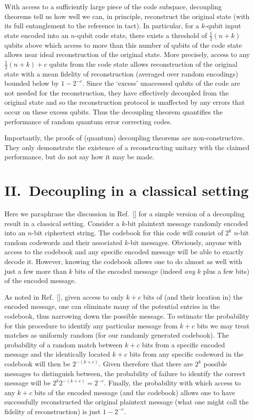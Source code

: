 \documentclass[aps,showpacs,prl,12pt]{revtex4}
\begin{document}
With access to a sufficiently large piece of the code subspace,
decoupling theorems tell us how well we can, in principle,
reconstruct the original state (with its full entanglement to the
reference in tact). In particular, for a $k$-qubit input state encoded
into an $n$-qubit code state, there exists a threshold of $\frac{1}{2}(n+k)$
qubits above which access to more than this number of qubits of the
code state allows near ideal reconstruction of the original state.
More precisely, access to any $\frac{1}{2}(n+k)+c$ qubits from the code
state allows reconstruction \cite{Hayden07app} of the original state with
a mean fidelity of reconstruction (averaged over random encodings) bounded
below by $1-2^{-c}$. Since the `excess' unaccessed qubits of the code
are not needed for the reconstruction, they have effectively decoupled
from the original state and so the reconstruction protocol is unaffected
by any errors that occur on these excess qubits. Thus the decoupling
theorem quantifies the performance of random quantum error correcting
codes.

Importantly, the proofs of (quantum) decoupling theorems are
non-constructive. They only demonstrate the existence of a reconstructing
unitary with the claimed performance, but do not say how it may be
made.

\section{II.\ Decoupling in a classical setting}

Here we paraphrase the discussion in Ref.~[] for a
simple version of a decoupling result in a classical setting. Consider
a $k$-bit plaintext message randomly encoded into an $n$-bit ciphertext
string. The codebook for this code will consist of $2^k$ $n$-bit random
codewords and their associated $k$-bit messages. Obviously, anyone with
access to the codebook and any specific encoded message will be able to
exactly decode it. However, knowing the codebook allows one to do almost
as well with just a few more than $k$ bits of the encoded message 
(indeed {\it any\/} $k$ plus a few bits) of the encoded message.

As noted in Ref.~[], given access to only $k+c$ bits
of (and their location in) the encoded message, one can eliminate
many of the potential entries in the codebook, thus narrowing down the
possible message. To estimate the probability for this procedure
to identify any particular message from $k+c$ bits we may treat matches
as uniformly random (for our randomly generated codebook).
The probability of a random match between $k+c$ bits from a specific
encoded message and the identically located $k+c$ bits from any specific
codeword in the codebook will then be $2^{-(k+c)}$. Given therefore that
there are $2^k$ possible messages to distinguish between, the probability
of failure to identify the correct message will be $2^k 2^{-(k+c)}=2^{-c}$.
Finally, the probability with which access to any $k+c$ bits of
the encoded message (and the codebook) allows one to have successfully
reconstructed the original plaintext message (what one might call the
fidelity of reconstruction) is just $1-2^{-c}$.
\end{document}
